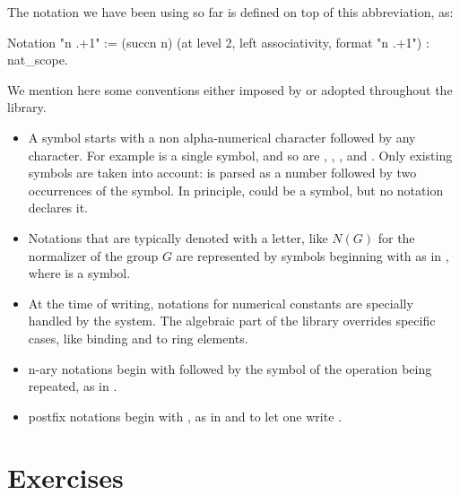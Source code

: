 The notation  we have been using so far is defined on top of
this abbreviation, as:

\begin{coq}{}{}
Notation "n .+1" := (succn n) (at level 2, left associativity,
  format "n .+1") : nat_scope.
\end{coq}

We mention here some conventions either imposed by \Coq{}
or adopted throughout the \mcbMC{} library.

\begin{itemize}
\item A symbol starts with a non alpha-numerical character followed by
	any character.  For example  is a single symbol, and so are
	, \C{\%/}, \C{<=}, and \C{[::}.  Only existing
	symbols are taken into account:  is parsed as a number
	followed by two occurrences of the  symbol.  In principle,
          could be a symbol, but no notation declares it.
\item Notations that are typically denoted with a letter, like $N(G)$ for the
	normalizer of the group $G$ are represented by symbols beginning
	with  as in , where  is a symbol.
\item At the time of writing, notations for numerical constants are specially
	handled by the system.  The algebraic part of the library overrides
	specific cases, like binding  and  to ring elements.
\item n-ary notations begin with \C{[} followed by the symbol of the
	operation being repeated, as in .
\item postfix notations begin with , as in  and 
	to let one write .
\end{itemize}



\newpage
\section{Exercises}

